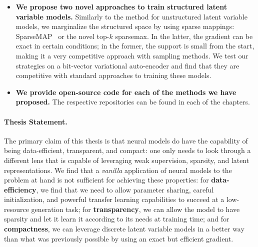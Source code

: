 \begin{itemize}
      \item \textbf{We propose two novel approaches to train structured latent variable models.}
            Similarly to the method for unstructured latent variable models, we marginalize
            the structured space by using sparse mappings: SparseMAP~\citep{niculae2018sparsemap} or the novel top-$k$
            sparsemax. In the latter, the gradient can be exact in certain conditions; in the former,
            the support is small from the start, making it a very competitive approach with sampling methods.
            We test our strategies on a bit-vector variational auto-encoder and find that
            they are competitive with standard approaches to training these models.

      \item \textbf{We provide open-source code for each of the
                  methods we have proposed.}
            The respective repositories can be found in each
            of the chapters.


\end{itemize}

\paragraph*{Thesis Statement.} The primary claim of this thesis is
that neural
models do have the capability of being data-efficient, transparent, and
compact: one only needs to look through a different lens that is
capable of leveraging weak supervision, sparsity, and latent
representations. We find that a \textit{vanilla}
application of neural models to the problem at hand is not sufficient
for achieving these properties: for \textbf{data-efficiency}, we find that we need
to allow parameter sharing, careful initialization, and powerful
transfer learning capabilities to succeed at a low-resource
generation task; for \textbf{transparency}, we can allow the model to have
sparsity and let it learn it according to its needs at training time; and
for \textbf{compactness}, we can leverage discrete latent variable models in a
better way than what was previously possible by using an exact but
efficient gradient.
